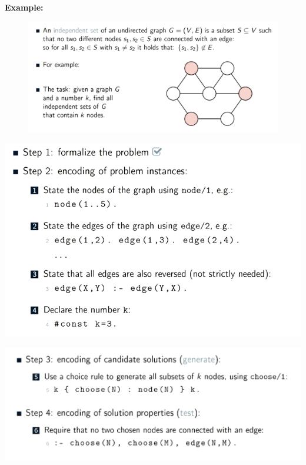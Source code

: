 \newpage
\textbf{Example:} 
\begin{figure}[ht!]
    \includegraphics[scale=0.6]{figures/example 1.png}
\end{figure}


\begin{minipage}{0.5\textwidth}
    \includegraphics[scale=0.5]{figures/example 2.png}
\end{minipage}
\begin{minipage}{0.5\textwidth}
    \includegraphics[scale=0.5]{figures/example 3.png}
\end{minipage}

